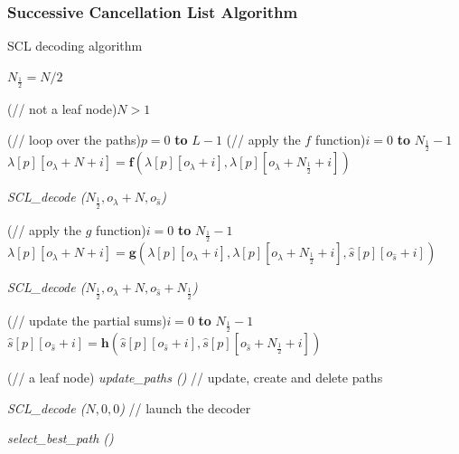 \subsubsection{Successive Cancellation List Algorithm}

\begin{algorithm}
  \caption{SCL decoding algorithm}\label{alg:polar_scl}



  {
    $N_{\frac{1}{2}} = N / 2$

    \uIf(// not a leaf node){$N > 1$}
    {
      \For(// loop over the paths){$p=0$ \textbf{to} $L-1$}
      {
        \For(// apply the $f$ function){$i=0$ \textbf{to} $N_{\frac{1}{2}}-1$}
        {
          $\lambda[p][o_\lambda + N + i] = \bm{f}(\lambda[p][o_\lambda + i], \lambda[p][o_\lambda + N_{\frac{1}{2}} + i])$
        }
      }

      \textit{SCL\_decode ($N_{\frac{1}{2}}, o_{\lambda} + N, o_{\hat{s}}$)}

      {
        \For(// apply the $g$ function){$i=0$ \textbf{to} $N_{\frac{1}{2}}-1$}
        {
          $\lambda[p][o_\lambda + N + i] = \bm{g}(\lambda[p][o_\lambda + i], \lambda[p][o_\lambda + N_{\frac{1}{2}} + i], \hat{s}[p][o_{\hat{s}} + i])$
        }
      }

      \textit{SCL\_decode ($N_{\frac{1}{2}}, o_{\lambda} + N, o_{\hat{s}} + N_{\frac{1}{2}}$)}

      {
        \For(// update the partial sums){$i=0$ \textbf{to} $N_{\frac{1}{2}}-1$}
        {
          $\hat{s}[p][o_{\hat{s}} + i] = \bm{h}(\hat{s}[p][o_{\hat{s}} + i], \hat{s}[p][o_{\hat{s}} + N_{\frac{1}{2}} + i])$
        }
      }
    }
    \Else(// a leaf node)
    {
      \textit{update\_paths ()} // update, create and delete paths
    }
  }

  \textit{SCL\_decode ($N, 0, 0$)} // launch the decoder

  \textit{select\_best\_path ()}
\end{algorithm}

